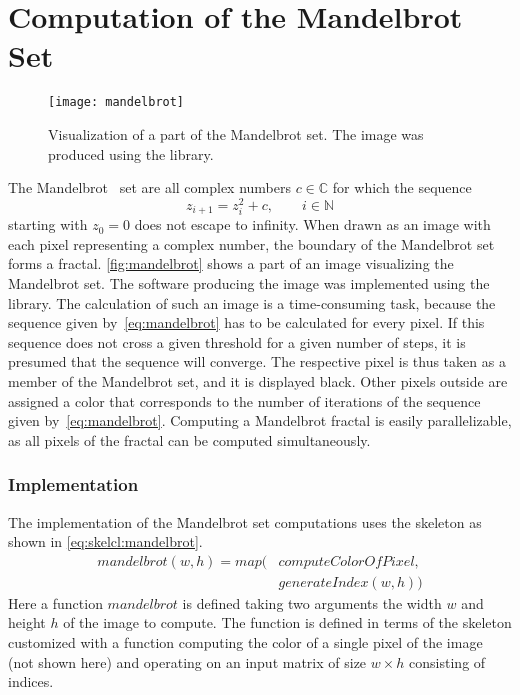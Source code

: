 \section{Computation of the Mandelbrot Set}

\begin{figure}[tb]
  \centering
  \texttt{[image: mandelbrot]}
  \caption{Visualization of a part of the Mandelbrot set. The image was produced using the \SkelCL library.}
  \label{fig:mandelbrot}
\end{figure}

The Mandelbrot~\cite{Mandelbrot1980} set are all complex numbers $c \in {\mathbb C}$ for which the sequence
\begin{equation}
	z_{i+1} = z_{i}^{2} + c,\qquad i\in {\mathbb N}
	\label{eq:mandelbrot}
\end{equation}
starting with $z_{0}=0$ does not escape to infinity.
When drawn as an image with each pixel representing a complex number, the boundary of the Mandelbrot set forms a fractal.
\autoref{fig:mandelbrot} shows a part of an image visualizing the Mandelbrot set.
The software producing the image was implemented using the \SkelCL library. 
The calculation of such an image is a time-consuming task, because the sequence given by~\autoref{eq:mandelbrot} has to be calculated for every pixel.
If this sequence does not cross a given threshold for a given number of steps, it is presumed that the sequence will converge.
The respective pixel is thus taken as a member of the Mandelbrot set, and it is displayed black.
Other pixels outside are assigned a color that corresponds to the number of iterations of the sequence given by~\autoref{eq:mandelbrot}.
Computing a Mandelbrot fractal is easily parallelizable, as all pixels of the fractal can be computed simultaneously.

\subsubsection*{\SkelCL Implementation}
\label{sec:mandelbrot:implementation}
The implementation of the Mandelbrot set computations uses the \map skeleton as shown in \autoref{eq:skelcl:mandelbrot}.
\begin{align}
  mandelbrot(w, h) = map\big(& computeColorOfPixel, \nonumber\\
                             & generateIndex(w, h)\big)
  \label{eq:skelcl:mandelbrot}
\end{align}
Here a function $mandelbrot$ is defined taking two arguments the width $w$ and height $h$ of the image to compute.
The function is defined in terms of the \map skeleton customized with a function computing the color of a single pixel of the image (not shown here) and operating on an input matrix of size $w\times h$ consisting of indices.

